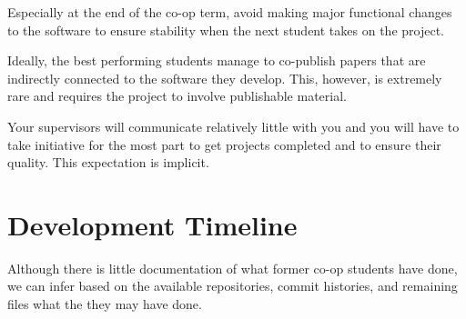 \documentclass{article}
\begin{document}
Especially at the end of the co-op term, avoid making major functional changes to the software to ensure stability when the next student takes on the project.

Ideally, the best performing students manage to co-publish papers that are indirectly connected to the software they develop. This, however, is extremely rare and requires the project to involve publishable material.

Your supervisors will communicate relatively little with you and you will have to take initiative for the most part to get projects completed
and to ensure their quality. This expectation is implicit.

\section{Development Timeline}

Although there is little documentation of what former co-op students have done, we can infer based on the available repositories, commit histories, and remaining files what the they may have done.
\end{document}

